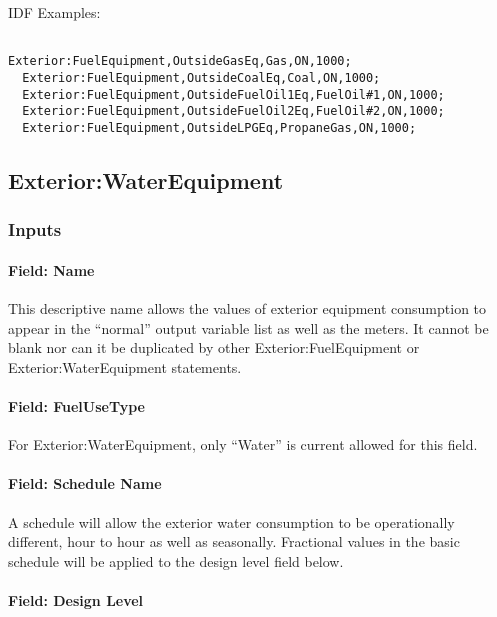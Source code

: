 IDF Examples:

\begin{lstlisting}

Exterior:FuelEquipment,OutsideGasEq,Gas,ON,1000;
  Exterior:FuelEquipment,OutsideCoalEq,Coal,ON,1000;
  Exterior:FuelEquipment,OutsideFuelOil1Eq,FuelOil#1,ON,1000;
  Exterior:FuelEquipment,OutsideFuelOil2Eq,FuelOil#2,ON,1000;
  Exterior:FuelEquipment,OutsideLPGEq,PropaneGas,ON,1000;
\end{lstlisting}

\subsection{Exterior:WaterEquipment}\label{exteriorwaterequipment}

\subsubsection{Inputs}\label{inputs-2-014}

\paragraph{Field: Name}\label{field-name-2-013}

This descriptive name allows the values of exterior equipment consumption to appear in the ``normal'' output variable list as well as the meters. It cannot be blank nor can it be duplicated by other Exterior:FuelEquipment or Exterior:WaterEquipment statements.

\paragraph{Field: FuelUseType}\label{field-fuelusetype}

For Exterior:WaterEquipment, only ``Water'' is current allowed for this field.

\paragraph{Field: Schedule Name}\label{field-schedule-name-2-000}

A schedule will allow the exterior water consumption to be operationally different, hour to hour as well as seasonally. Fractional values in the basic schedule will be applied to the design level field below.

\paragraph{Field: Design Level}\label{field-design-level-2}

